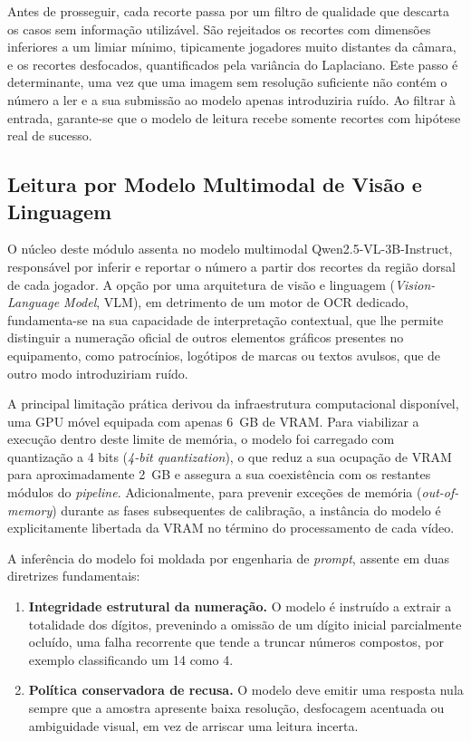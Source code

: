 Antes de prosseguir, cada recorte passa por um filtro de qualidade que descarta os casos sem
informação utilizável. São rejeitados os recortes com dimensões inferiores a um limiar mínimo,
tipicamente jogadores muito distantes da câmara, e os recortes desfocados, quantificados pela
variância do Laplaciano. Este passo é determinante, uma vez que uma imagem sem resolução
suficiente não contém o número a ler e a sua submissão ao modelo apenas introduziria ruído. Ao
filtrar à entrada, garante-se que o modelo de leitura recebe somente recortes com hipótese real
de sucesso.

\subsection{Leitura por Modelo Multimodal de Visão e Linguagem}

O núcleo deste módulo assenta no modelo multimodal Qwen2.5-VL-3B-Instruct, responsável por
inferir e reportar o número a partir dos recortes da região dorsal de cada jogador. A opção por
uma arquitetura de visão e linguagem (\emph{Vision-Language Model}, VLM), em detrimento de um
motor de OCR dedicado, fundamenta-se na sua capacidade de interpretação contextual, que lhe
permite distinguir a numeração oficial de outros elementos gráficos presentes no equipamento,
como patrocínios, logótipos de marcas ou textos avulsos, que de outro modo introduziriam ruído.

A principal limitação prática derivou da infraestrutura computacional disponível, uma GPU móvel
equipada com apenas 6~GB de VRAM. Para viabilizar a execução dentro deste limite de memória, o
modelo foi carregado com quantização a 4 bits (\emph{4-bit quantization}), o que reduz a sua
ocupação de VRAM para aproximadamente 2~GB e assegura a sua coexistência com os restantes
módulos do \emph{pipeline}. Adicionalmente, para prevenir exceções de memória (\emph{out-of-memory})
durante as fases subsequentes de calibração, a instância do modelo é explicitamente libertada da
VRAM no término do processamento de cada vídeo.

A inferência do modelo foi moldada por engenharia de \emph{prompt}, assente em duas diretrizes
fundamentais:

\begin{enumerate}
    \item \textbf{Integridade estrutural da numeração.} O modelo é instruído a extrair a
    totalidade dos dígitos, prevenindo a omissão de um dígito inicial parcialmente ocluído, uma
    falha recorrente que tende a truncar números compostos, por exemplo classificando um 14 como
    4.
    \item \textbf{Política conservadora de recusa.} O modelo deve emitir uma resposta nula
    sempre que a amostra apresente baixa resolução, desfocagem acentuada ou ambiguidade visual,
    em vez de arriscar uma leitura incerta.
\end{enumerate}

